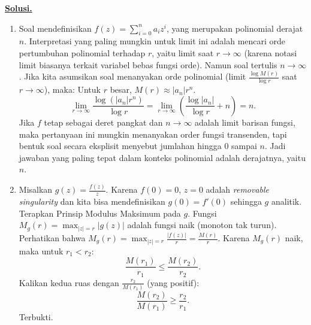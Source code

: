 \documentclass[12pt,twoside]{article}
\newenvironment{solution}
{
	\par\noindent\textbf{\underline{Solusi.}}\\
}
{
	\par
}
\begin{document}
\begin{enumerate}
\begin{solution}
\begin{enumerate}
            \item[(b)] Soal mendefinisikan $f(z) = \sum_{i=0}^n a_i z^i$, yang merupakan polinomial derajat $n$.
                  Interpretasi yang paling mungkin untuk limit ini adalah mencari orde pertumbuhan polinomial terhadap $r$, yaitu limit saat $r \to \infty$ (karena notasi limit biasanya terkait variabel bebas fungsi orde). Namun soal tertulis $n \to \infty$.
                  Jika kita asumsikan soal menanyakan orde polinomial (limit $\frac{\log M(r)}{\log r}$ saat $r \to \infty$), maka:
                  Untuk $r$ besar, $M(r) \approx |a_n| r^n$.
                  $$ \lim_{r \to \infty} \frac{\log(|a_n|r^n)}{\log r} = \lim_{r \to \infty} \left( \frac{\log|a_n|}{\log r} + n \right) = n. $$
                  Jika $f$ tetap sebagai deret pangkat dan $n \to \infty$ adalah limit barisan fungsi, maka pertanyaan ini mungkin menanyakan order fungsi transenden, tapi bentuk soal secara eksplisit menyebut jumlahan hingga $0$ sampai $n$. Jadi jawaban yang paling tepat dalam konteks polinomial adalah derajatnya, yaitu $n$.

            \item[(c)] Misalkan $g(z) = \frac{f(z)}{z}$. Karena $f(0)=0$, $z=0$ adalah \textit{removable singularity} dan kita bisa mendefinisikan $g(0)=f'(0)$ sehingga $g$ analitik.
                  Terapkan Prinsip Modulus Maksimum pada $g$. Fungsi $M_g(r) = \max_{|z|=r} |g(z)|$ adalah fungsi naik (monoton tak turun).
                  Perhatikan bahwa $M_g(r) = \max_{|z|=r} \frac{|f(z)|}{r} = \frac{M(r)}{r}$.
                  Karena $M_g(r)$ naik, maka untuk $r_1 < r_2$:
                  $$ \frac{M(r_1)}{r_1} \le \frac{M(r_2)}{r_2}. $$
                  Kalikan kedua ruas dengan $\frac{r_2}{M(r_1)}$ (yang positif):
                  $$ \frac{M(r_2)}{M(r_1)} \ge \frac{r_2}{r_1}. $$
                  Terbukti.
          \end{enumerate}
        \end{solution}


\end{enumerate}
\end{document}
